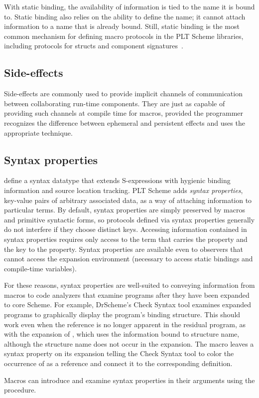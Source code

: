 \begin{schemeregion}
With static binding, the availability of information is tied to the
name it is bound to. Static binding also relies on the ability to
define the name; it cannot attach information to a name that is
already bound.  Still, static binding is the most common mechanism for
defining macro protocols in the PLT Scheme libraries, including
protocols for structs and component
signatures~\cite{culpepper05units}.

\subsection{Side-effects}

Side-effects are commonly used to provide implicit channels of
communication between collaborating run-time components. They are just
as capable of providing such channels at compile time for macros,
provided the programmer recognizes the difference between ephemeral
and persistent effects and uses the appropriate technique.



\subsection{Syntax properties}

\citet{dhb:sc} define a syntax datatype that extends S-expressions
with hygienic binding information and source location tracking.
PLT Scheme adds \emph{syntax properties}, key-value pairs of arbitrary
associated data, as a way of attaching information to particular
terms. By default, syntax properties are simply preserved by macros
and primitive syntactic forms, so protocols defined via syntax
properties generally do not interfere if they choose distinct
keys. Accessing information contained in syntax properties requires
only access to the term that carries the property and the key to the
property. Syntax properties are available even to observers that
cannot access the expansion environment (necessary to access static
bindings and compile-time variables).

For these reasons, syntax properties are well-suited to conveying
information from macros to code analyzers that examine programs after
they have been expanded to core Scheme.
%
For example, DrScheme's Check Syntax tool examines expanded programs to graphically
display the program's binding structure.  This should work even when the reference is no longer apparent in the residual program, as with the  expansion of
, which uses the information bound to structure name,
although the structure name does not occur in the expansion. The
 macro leaves a  syntax
property on its expansion telling the Check Syntax tool to color the
occurrence of  as a reference and connect it to the
corresponding definition.

Macros can introduce and examine syntax properties in their arguments
using the  procedure.

\end{schemeregion}
